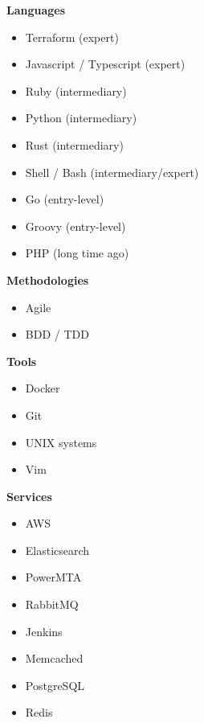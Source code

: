 \documentclass[9pt]{developercv} %
\begin{document}
\begin{minipage}[t]{0.3\textwidth} %
  \vspace{-\baselineskip}

  \textbf{Languages}
  \begin{itemize}
      \item Terraform {\footnotesize (expert)}
      \item Javascript / Typescript {\footnotesize (expert)}
      \item Ruby {\footnotesize (intermediary)}
      \item Python {\footnotesize (intermediary)}
      \item Rust {\footnotesize (intermediary)}
      \item Shell / Bash {\footnotesize (intermediary/expert)}
      \item Go {\footnotesize (entry-level)}
      \item Groovy {\footnotesize (entry-level)}
      \item PHP {\footnotesize (long time ago)}
  \end{itemize}
\end{minipage}
\hfill
\begin{minipage}[t]{0.3\textwidth}
  \vspace{-\baselineskip}

  \textbf{Methodologies}
  \begin{itemize}
      \item Agile
      \item BDD / TDD
  \end{itemize}

  \textbf{Tools}
  \begin{itemize}
      \item Docker
      \item Git
      \item UNIX systems
      \item Vim
  \end{itemize}
\end{minipage}
\hfill
\begin{minipage}[t]{0.3\textwidth}
  \vspace{-\baselineskip}

  \textbf{Services}
  \begin{itemize}
      \item AWS
      \item Elasticsearch
      \item PowerMTA
      \item RabbitMQ
      \item Jenkins
      \item Memcached
      \item PostgreSQL
      \item Redis
  \end{itemize}
\end{minipage}

\end{document}
